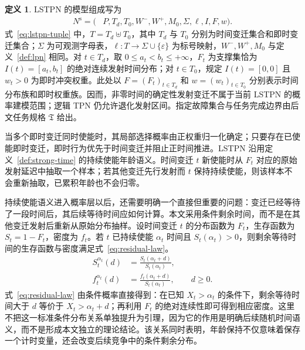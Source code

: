 \documentclass[master,fontset=ubuntu]{shnuthesis}
\theoremstyle{definition}
\newtheorem{thesisdefinition}{定义}
\begin{document}
\begin{thesisdefinition}
\label{def:lstpn}
LSTPN 的模型组成写为
\begin{equation}
\begin{aligned}
N^{\mathrm{s}}=\bigl(&P,T_d,T_0,W^-,W^+,M_0,\Sigma,\ell,I,F,w\bigr).
\end{aligned}
\label{eq:lstpn-tuple}
\end{equation}
式~\eqref{eq:lstpn-tuple} 中，\(T=T_d\uplus T_0\)，其中 \(T_d\) 与 \(T_0\) 分别为时间变迁集合和即时变迁集合；\(\Sigma\) 为可观测字母表，\(\ell:T\to\Sigma\cup\{\varepsilon\}\) 为标号映射，\(W^-,W^+,M_0\) 与定义~\ref{def:lpn} 相同。对 \(t\in T_d\)，取 \(0\leq a_t<b_t\leq+\infty\)，\(F_t\) 为支撑集恰为 \(I(t)=[a_t,b_t]\) 的绝对连续发射时间分布；对 \(t\in T_0\)，规定 \(I(t)=[0,0]\) 且 \(w_t>0\) 为即时冲突权重。此处以 \(F=(F_t)_{t\in T_d}\) 和 \(w=(w_t)_{t\in T_0}\) 分别表示时间分布族和即时权重族。因而，非零时间的确定性发射变迁不属于当前 LSTPN 的概率建模范围；逻辑 TPN 仍允许退化发射区间。指定故障集合与任务完成边界由后文任务规格 \(\mathfrak T\) 给出。
\end{thesisdefinition}

当多个即时变迁同时使能时，其局部选择概率由正权重归一化确定；只要存在已使能即时变迁，即时行为优先于时间变迁并阻止正时间推进。LSTPN 沿用定义~\ref{def:strong-time} 的持续使能年龄语义。时间变迁 \(t\) 新使能时从 \(F_t\) 对应的原始发射延迟中抽取一个样本；若其他变迁先行发射而 \(t\) 保持持续使能，则该样本不会重新抽取，已累积年龄也不会归零。

持续使能语义进入概率层以后，还需要明确一个直接但重要的问题：变迁已经等待了一段时间后，其后续等待时间应如何计算。本文采用条件剩余时间，而不是在其他变迁发射后重新从原始分布抽样。设时间变迁 \(t\) 的分布函数为 \(F_t\)，生存函数为 \(S_t=1-F_t\)，密度为 \(f_t\)。若 \(t\) 已持续使能 \(\alpha_t\) 时间且 \(S_t(\alpha_t)>0\)，则剩余等待时间的生存函数与密度满足式~\eqref{eq:residual-law}。
\begin{equation}
\begin{aligned}
S_t^{\alpha_t}(d)
&=
\frac{S_t(\alpha_t+d)}{S_t(\alpha_t)},\\
f_t^{\alpha_t}(d)
&=
\frac{f_t(\alpha_t+d)}{S_t(\alpha_t)},
\qquad d\geq0.
\end{aligned}
\label{eq:residual-law}
\end{equation}
式~\eqref{eq:residual-law} 由条件概率直接得到：在已知 \(X_t>\alpha_t\) 的条件下，剩余等待时间大于 \(d\) 等价于 \(X_t>\alpha_t+d\)；再利用 \(F_t\) 的绝对连续性即可得到相应密度。这里不把这一标准条件分布关系单独提升为引理，因为它的作用是明确后续随机时间语义，而不是形成本文独立的理论结论。该关系同时表明，年龄保持不仅意味着保存一个计时变量，还会改变后续竞争中的条件剩余分布。
\end{document}
